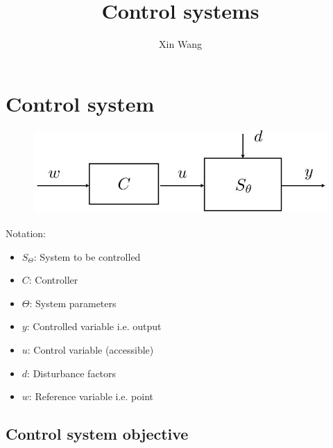 \documentclass[conference]{IEEEtran}
\begin{document}
\title{Control systems}
\author{Xin Wang}
\maketitle
\section{Control system}

\begin{figure} [h!]
    \centering
    \includegraphics[scale=0.4]{Ex1.JPG}
\end{figure}
Notation:
\begin{itemize}
    \item $S_{\Theta}$: System to be controlled
    \item $C$: Controller
    \item $\Theta$: System parameters
    \item $y$: Controlled variable i.e. output
    \item $u$: Control variable (accessible)
    \item $d$: Disturbance factors
    \item $w$: Reference variable i.e. point 
\end{itemize}

\subsection{Control system objective}
\end{document}
